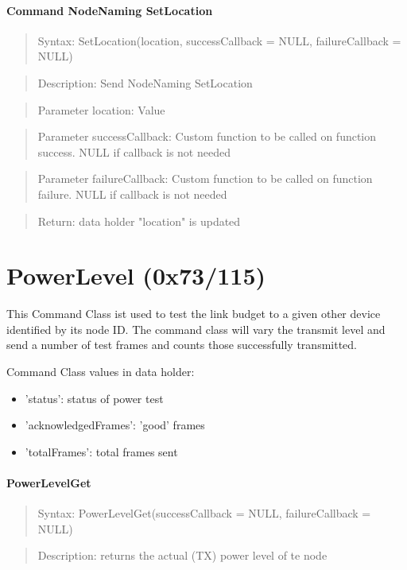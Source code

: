 \paragraph {Command NodeNaming SetLocation}
\begin{quote} Syntax: SetLocation(location, successCallback = NULL, failureCallback = NULL)\end{quote}
\begin{quote} Description: Send NodeNaming SetLocation\end{quote}
\begin{quote} Parameter location: Value\end{quote}
\begin{quote} Parameter successCallback: Custom function to be called on function success. NULL if callback is not needed\end{quote}
\begin{quote} Parameter failureCallback: Custom function to be called on function failure. NULL if callback is not needed\end{quote}
\begin{quote} Return: data holder "location" is updated\end{quote}


\section{PowerLevel (0x73/115)}

This Command Class ist used to test the link budget to a given other device identified 
by its node ID. The command class will vary the transmit level and send a number of test frames
and counts those successfully transmitted. 

Command Class values in data holder:
\begin{itemize}
\item 'status':  status of power test
\item 'acknowledgedFrames':  'good' frames
\item 'totalFrames':  total frames sent 
\end{itemize}

\paragraph {PowerLevelGet}
\begin{quote} Syntax: PowerLevelGet(successCallback = NULL, failureCallback = NULL)\end{quote}
\begin{quote} Description: returns the actual (TX) power level of te node\end{quote}

